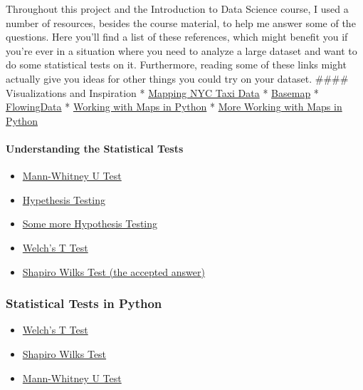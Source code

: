 \documentclass{article}
\providecommand{\tightlist}{%
      \setlength{\itemsep}{0pt}\setlength{\parskip}{0pt}}
\begin{document}
    Throughout this project and the Introduction to Data Science course, I
used a number of resources, besides the course material, to help me
answer some of the questions. Here you'll find a list of these
references, which might benefit you if you're ever in a situation where
you need to analyze a large dataset and want to do some statistical
tests on it. Furthermore, reading some of these links might actually
give you ideas for other things you could try on your dataset. \#\#\#\#
Visualizations and Inspiration *
\href{http://www.danielforsyth.me/mapping-nyc-taxi-data/}{Mapping NYC
Taxi Data} *
\href{http://basemaptutorial.readthedocs.org/en/latest/}{Basemap} *
\href{http://flowingdata.com/2009/11/12/how-to-make-a-us-county-thematic-map-using-free-tools/}{FlowingData}
* \href{http://maxberggren.se/2015/08/04/basemap/}{Working with Maps in
Python} *
\href{http://sensitivecities.com/so-youd-like-to-make-a-map-using-python-EN.html}{More
Working with Maps in Python}

\paragraph{Understanding the Statistical
Tests}\label{understanding-the-statistical-tests}

\begin{itemize}
\tightlist
\item
  \href{https://en.wikipedia.org/wiki/Mann\%E2\%80\%93Whitney_U_test}{Mann-Whitney
  U Test}
\item
  \href{http://stattrek.com/hypothesis-test/hypothesis-testing.aspx}{Hypethesis
  Testing}
\item
  \href{https://en.wikipedia.org/wiki/Statistical_hypothesis_testing}{Some
  more Hypothesis Testing}
\item
  \href{https://en.wikipedia.org/wiki/Welch\%27s_t_test}{Welch's T Test}
\item
  \href{http://stackoverflow.com/questions/7781798/seeing-if-data-is-normally-distributed-in-r/7788452\#7788452}{Shapiro
  Wilks Test (the accepted answer)}
\end{itemize}

\subsubsection{Statistical Tests in
Python}\label{statistical-tests-in-python}

\begin{itemize}
\tightlist
\item
  \href{http://docs.scipy.org/doc/scipy-0.15.1/reference/generated/scipy.stats.ttest_ind.html}{Welch's
  T Test}
\item
  \href{http://docs.scipy.org/doc/scipy-0.15.1/reference/generated/scipy.stats.shapiro.html}{Shapiro
  Wilks Test}
\item
  \href{http://docs.scipy.org/doc/scipy/reference/generated/scipy.stats.mannwhitneyu.html}{Mann-Whitney
  U Test}
\end{itemize}
\end{document}

